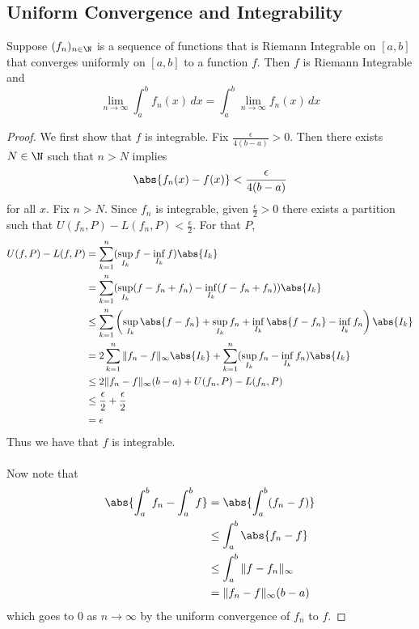 \subsection{Uniform Convergence and Integrability}
\begin{thm}{}{} Suppose $(f_n)_{n\in\N}$ is a sequence of functions that is Riemann Integrable on $[a,b]$ that converges uniformly on $[a,b]$ to a function $f$. Then $f$ is Riemann Integrable and $$\lim_{n\to\infty}\int_a^bf_n(x)\,dx=\int_a^b\lim_{n\to\infty}f_n(x)\,dx$$ \tcbline
\begin{proof} We first show that $f$ is integrable. Fix $\frac{\epsilon}{4(b-a)}>0$. Then there exists $N\in\N$ such that $n>N$ implies $$\abs{f_n(x)-f(x)}<\frac{\epsilon}{4(b-a)}$$ for all $x$. Fix $n>N$. Since $f_n$ is integrable, given $\frac{\epsilon}{2}>0$ there exists a partition such that $U(f_n,P)-L(f_n,P)<\frac{\epsilon}{2}$. For that $P$,
\begin{align*}
U(f,P)-L(f,P)&=\sum_{k=1}^n(\sup_{I_k}f-\inf_{I_k}f)\abs{I_k}\\
&=\sum_{k=1}^n(\sup_{I_k}(f-f_n+f_n)-\inf_{I_k}(f-f_n+f_n))\abs{I_k}\\
&\leq\sum_{k=1}^n\left(\sup_{I_k}\abs{f-f_n}+\sup_{I_k}f_n+\inf_{I_k}\abs{f-f_n}-\inf_{I_k}f_n\right)\abs{I_k}\\
&=2\sum_{k=1}^n\|f_n-f\|_\infty\abs{I_k}+\sum_{k=1}^n(\sup_{I_k}f_n-\inf_{I_k}f_n)\abs{I_k}\\
&\leq 2\|f_n-f\|_\infty(b-a)+U(f_n,P)-L(f_n,P)\\
&\leq\frac{\epsilon}{2}+\frac{\epsilon}{2}\\
&=\epsilon
\end{align*}
Thus we have that $f$ is integrable. 
\\~\\
Now note that
\begin{align*}
\abs{\int_a^bf_n-\int_a^bf}&=\abs{\int_a^b(f_n-f)}\\
&\leq\int_a^b\abs{f_n-f}\\
&\leq\int_a^b\|f-f_n\|_\infty\\
&=\|f_n-f\|_\infty(b-a)
\end{align*}
which goes to $0$ as $n\to\infty$ by the uniform convergence of $f_n$ to $f$. 
\end{proof}
\end{thm}

